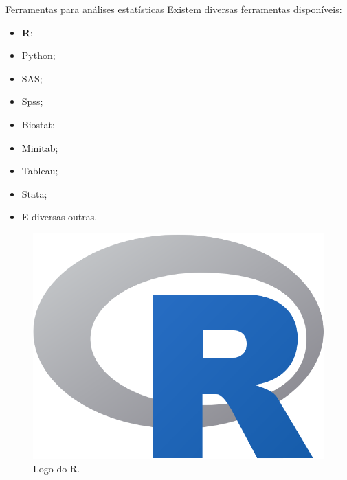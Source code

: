 \documentclass[
  ignorenonframetext,
  serif,
  professionalfont,
  usenames,
  dvipsnames,
  aspectratio = 169]{beamer}
\def\beginAHalfColumn{\begin{minipage}{0.49\textwidth}}%
\def\endColumns{\end{minipage}}%
\begin{document}
\begin{frame}{Ferramentas para análises estatísticas}
\label{ferramentas-para-anuxe1lises-estatuxedsticas-1}
Existem diversas ferramentas disponíveis:

\beginAHalfColumn

\begin{itemize}
\item
  \textbf{R};
\item
  Python;
\item
  SAS;
\item
  Spss;
\item
  Biostat;
\item
  Minitab;
\item
  Tableau;
\item
  Stata;
\item
  E diversas outras.
\end{itemize}

\endColumns
\beginAHalfColumn

\begin{figure}

{\centering \includegraphics[width=0.8\linewidth]{./img/rlogo} 

}

\caption{Logo do R.}\label{fig:unnamed-chunk-5}
\end{figure}

\endColumns
\end{frame}
\end{document}
